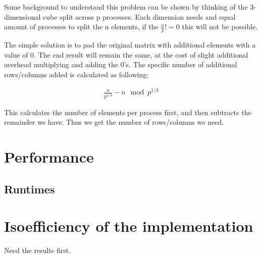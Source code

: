 \documentclass[a4paper,11pt,oneside]{book}
\begin{document}
Some background to understand this problem can be shown by thinking of the 3-dimensional cube split across p processes. Each dimension needs and equal amount of processes to split the n elements, if the $\frac{n}{p} != 0$ this will not be possible.

The simple solution is to pad the original matrix with additional elements with a value of 0. The end result will remain the same, at the cost of slight additional overhead multiplying and adding the 0's. The specific number of additional rows/columns added is calculated as following:

\begin{align*}
    \frac{n}{p^{1/3}} - n \mod p^{1/3}
\end{align*}

This calculates the number of elements per process first, and then subtracts the remainder we have. Thus we get the number of rows/columns we need.

\chapter{Performance}
\section{Runtimes}




\chapter{Isoefficiency of the implementation}
Need the results first.
\end{document}
